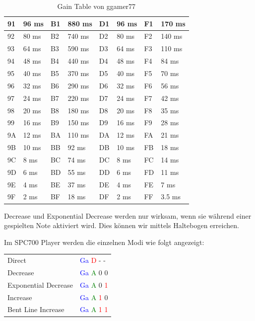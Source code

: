 \begin{table}[htbp]
\begin{tabularx}{\textwidth}{|l|X|l|X|l|X|l|X|}
	\hline
	91 & 96 ms & B1 & 880 ms & D1 & 96 ms & F1 & 170 ms \\
	\hline
	92 & 80 ms & B2 & 740 ms & D2 & 80 ms & F2 & 140 ms \\
	\hline
	93 & 64 ms & B3 & 590 ms & D3 & 64 ms & F3 & 110 ms \\
	\hline
	94 & 48 ms & B4 & 440 ms & D4 & 48 ms & F4 & 84 ms \\
	\hline
	95 & 40 ms & B5 & 370 ms & D5 & 40 ms & F5 & 70 ms \\
	\hline
	96 & 32 ms & B6 & 290 ms & D6 & 32 ms & F6 & 56 ms \\
	\hline
	97 & 24 ms & B7 & 220 ms & D7 & 24 ms & F7 & 42 ms \\
	\hline
	98 & 20 ms & B8 & 180 ms & D8 & 20 ms & F8 & 35 ms \\
	\hline
	99 & 16 ms & B9 & 150 ms & D9 & 16 ms & F9 & 28 ms \\
	\hline
	9A & 12 ms & BA & 110 ms & DA & 12 ms & FA & 21 ms \\
	\hline
	9B & 10 ms & BB & 92 ms & DB & 10 ms & FB & 18 ms \\
	\hline
	9C & 8 ms & BC & 74 ms & DC & 8 ms & FC & 14 ms \\
	\hline
	9D & 6 ms & BD & 55 ms & DD & 6 ms & FD & 11 ms \\
	\hline
	9E & 4 ms & BE & 37 ms & DE & 4 ms & FE & 7 ms \\
	\hline
	9F & 2 ms & BF & 18 ms & DF & 2 ms & FF & 3.5 ms \\
	\hline
\end{tabularx}
\caption{Gain Table von ggamer77}
\end{table}

\medskip

Decrease und Exponential Decrease werden nur wirksam, wenn sie während einer gespielten Note aktiviert wird. Dies können wir mittels Haltebogen erreichen.

\bigskip

Im SPC700 Player werden die einzelnen Modi wie folgt angezeigt: 

\bigskip

\begin{tabularx}{\textwidth}{l l}
Direct & 
\textcolor{blue}{Ga}
\textcolor{red}{D}
- -
\\
Decrease & 
\textcolor{blue}{Ga}
\textcolor{green}{A}
0 0
\\
Exponential Decrease & 
\textcolor{blue}{Ga}
\textcolor{green}{A}
0
\textcolor{red}{1}
\\
Increase &
\textcolor{blue}{Ga}
\textcolor{green}{A}
\textcolor{red}{1}
0
\\
Bent Line Increase &
\textcolor{blue}{Ga}
\textcolor{green}{A}
\textcolor{red}{1}
\textcolor{red}{1}
\end{tabularx}

